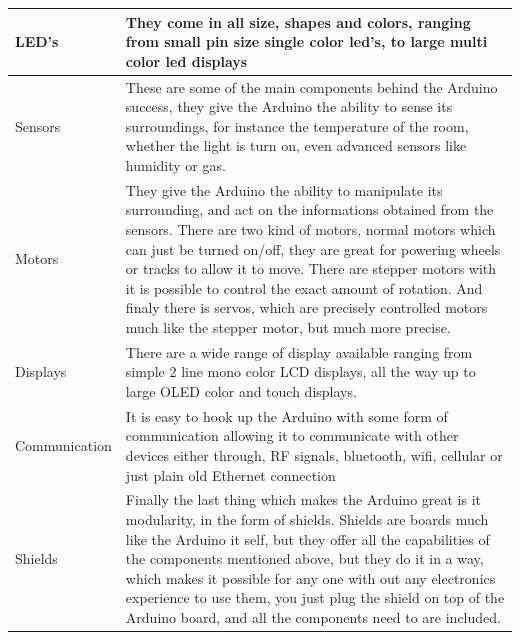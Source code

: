 \begin{tabular}{|l|l|}
\hline 
LED's & They come in all size, shapes and colors, ranging from small pin size single color led's, to large multi color led displays  \\ 
\hline 
Sensors & These are some of the main components behind the Arduino success, they give the Arduino the ability to sense its surroundings, for instance the temperature of the room, whether the light is turn on, even advanced sensors like humidity or gas.  \\ 
\hline 
Motors & They give the Arduino the ability to manipulate its surrounding, and act on the informations obtained from the sensors. There are two kind of motors, normal motors which can just be turned on/off, they are great for powering wheels or tracks to allow it to move. There are stepper motors with it is possible to control the exact amount of rotation. And finaly there is servos, which are precisely controlled motors much like the stepper motor, but much more precise.   \\ 
\hline 
Displays & There are a wide range of display available ranging from simple 2 line mono color LCD displays, all the way up to large OLED color and touch displays.   \\ 
\hline 
Communication & It is easy to hook up the Arduino with some form of communication allowing it to communicate with other devices either through, RF signals, bluetooth, wifi, cellular or just plain old Ethernet connection \\ 
\hline 
Shields & Finally the last thing which makes the Arduino great is it modularity, in the form of shields. Shields are boards much like the Arduino it self, but they offer all the capabilities of the components mentioned above, but they do it in a way, which makes it possible for any one with out any electronics experience to use them, you just plug the shield on top of the Arduino board, and all the components need to are included. \\
\hline
\end{tabular} 

